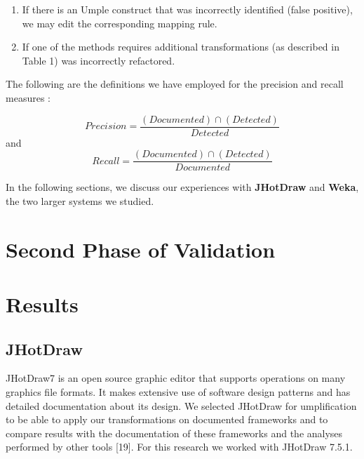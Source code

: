 \begin{enumerate}
\begin{enumerate}
		\item If there is an Umple construct that was incorrectly identified (false positive), we may edit the corresponding mapping rule.
		
		\item If one of the methods requires additional transformations (as described in Table 1) was incorrectly refactored.
		
	\end{enumerate}
\end{enumerate}

The following are the definitions we have employed for the precision and recall measures \cite{precisionRecallDef}:

\[  Precision=\frac{(Documented) \cap  (Detected)}{Detected}\]
and \\
\[  Recall=\frac{(Documented) \cap (Detected)}{Documented} \]

 
In the following sections, we discuss our experiences with \textbf{JHotDraw} and \textbf{Weka}, the two larger systems we studied.


\section{Second Phase of Validation}

\section{Results}

\subsection{JHotDraw}
 
JHotDraw7 \cite{jhotdraw} is an open source graphic editor that supports operations on many graphics file formats. It makes extensive use of software design patterns and has detailed documentation about its design. We selected JHotDraw for umplification to be able to apply our transformations on documented frameworks and to compare results with the documentation of these frameworks and the analyses performed by other tools [19]. For this research we worked with JHotDraw 7.5.1.

